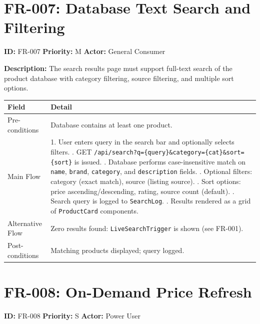 \documentclass[12pt,a4paper]{report}
\begin{document}
\section{FR-007: Database Text Search and Filtering}

\begin{reqbox}
\textbf{ID:} FR-007 \quad \textbf{Priority:} M \quad \textbf{Actor:} General Consumer
\end{reqbox}

\textbf{Description:} The search results page must support full-text search of
the product database with category filtering, source filtering, and multiple
sort options.

\begin{longtable}{L{3cm} L{10cm}}
  \toprule
  \textbf{Field} & \textbf{Detail} \\
  \midrule
  \endhead
  Pre-conditions & Database contains at least one product. \\[3pt]
  Main Flow &
    1. User enters query in the search bar and optionally selects filters. . GET \texttt{/api/search?q=\{query\}\&category=\{cat\}\&sort=\{sort\}} is issued. . Database performs case-insensitive match on \texttt{name}, \texttt{brand},
       \texttt{category}, and \texttt{description} fields. . Optional filters: category (exact match), source (listing source). . Sort options: price ascending/descending, rating, source count (default). . Search query is logged to \texttt{SearchLog}. . Results rendered as a grid of \texttt{ProductCard} components. \\[3pt]
  Alternative Flow &
    Zero results found: \texttt{LiveSearchTrigger} is shown (see FR-001). \\[3pt]
  Post-conditions & Matching products displayed; query logged. \\
  \bottomrule
\end{longtable}

\section{FR-008: On-Demand Price Refresh}

\begin{reqbox}
\textbf{ID:} FR-008 \quad \textbf{Priority:} S \quad \textbf{Actor:} Power User
\end{reqbox}
\end{document}
